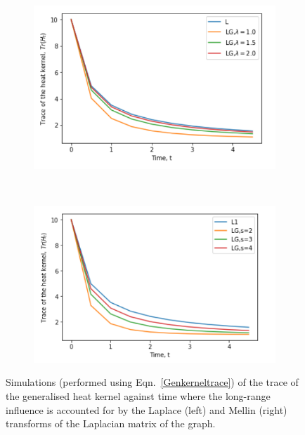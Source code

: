 \documentclass[10pt,a4paper]{article}
\begin{document}
        \begin{figure}[H]
        	\centering
        	\begin{subfigure}[b]{0.45\textwidth}
        		\includegraphics[width= \textwidth]{images/Laplace-heattrace.png}
        		\caption{}
        		\label{model1-mellin}
        	\end{subfigure}~
        	\begin{subfigure}[b]{0.45\textwidth}
        		\includegraphics[width= \textwidth]{images/model-2-mellin.png}
        		\caption{}
        		\label{model2-mellin}
        	\end{subfigure} 
        	\caption{Simulations (performed using Eqn.~\ref{Genkerneltrace}) of the trace of the generalised heat kernel against time where the long-range influence is accounted for by the Laplace (left) and Mellin (right) transforms of the Laplacian matrix of the graph.}
        	\label{toy-Mellin-Laplce-simulations}
        \end{figure}
    
\end{document}
